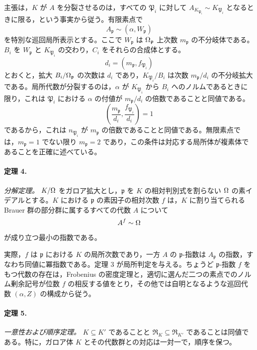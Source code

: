 主張は，\(K\) が \(A\) を分裂させるのは，すべての \(\mathfrak P_i\) に対して \(A_{K_{\mathfrak P_i}}\sim K_{\mathfrak P_i}\) となるときに限る，という事実から従う。有限素点で
\[
        A_{\mathfrak p}\sim(\alpha,W_{\mathfrak p})
\]
を特別な巡回局所表示とする。ここで \(W_{\mathfrak p}\) は \(\Omega_{\mathfrak p}\) 上次数 \(m_{\mathfrak p}\) の不分岐体である。\(B_i\) を \(W_{\mathfrak p}\) と \(K_{\mathfrak P_i}\) の交わり，\(C_i\) をそれらの合成体とする。
\[
        d_i=(m_{\mathfrak p},f_{\mathfrak P_i})
\]
とおくと，拡大 \(B_i/\Omega_{\mathfrak p}\) の次数は \(d_i\) であり，\(K_{\mathfrak P_i}/B_i\) は次数 \(m_{\mathfrak p}/d_i\) の不分岐拡大である。局所代数が分裂するのは，\(\alpha\) が \(K_{\mathfrak P_i}\) から \(B_i\) へのノルムであるときに限り，これは \(\mathfrak P_i\) における \(\alpha\) の付値が \(m_{\mathfrak p}/d_i\) の倍数であることと同値である。
\[
        \left(\frac{m_{\mathfrak p}}{d_i},\frac{f_{\mathfrak P_i}}{d_i}\right)=1
\]
であるから，これは \(n_{\mathfrak P_i}\) が \(m_{\mathfrak p}\) の倍数であることと同値である。無限素点では，\(m_{\mathfrak p}=1\) でない限り \(m_{\mathfrak p}=2\) であり，この条件は対応する局所体が複素体であることを正確に述べている。

\paragraph{定理 4.}
\emph{分解定理。} \(K/\Omega\) をガロア拡大とし，\(\mathfrak p\) を \(K\) の相対判別式を割らない \(\Omega\) の素イデアルとする。\(K\) における \(\mathfrak p\) の素因子の相対次数 \(f\) は，\(K\) に割り当てられる Brauer 群の部分群に属するすべての代数 \(A\) について
\[
        A^f\sim\Omega
\]
が成り立つ最小の指数である。

実際，\(f\) は \(\mathfrak p\) における \(K\) の局所次数であり，一方 \(A\) の \(\mathfrak p\)-指数は \(A_{\mathfrak p}\) の指数，すなわち同値に冪指数である。定理 3 が局所判定を与える。ちょうど \(\mathfrak p\)-指数 \(f\) をもつ代数の存在は，Frobenius の密度定理と，適切に選んだ二つの素点でのノルム剰余記号が位数 \(f\) の相反する値をとり，その他では自明となるような巡回代数 \((\alpha,Z)\) の構成から従う。

\paragraph{定理 5.}
\emph{一意性および順序定理。} \(K\subseteq K'\) であることと \(\mathfrak R_K\subseteq\mathfrak R_{K'}\) であることは同値である。特に，ガロア体 \(K\) とその代数群との対応は一対一で，順序を保つ。


